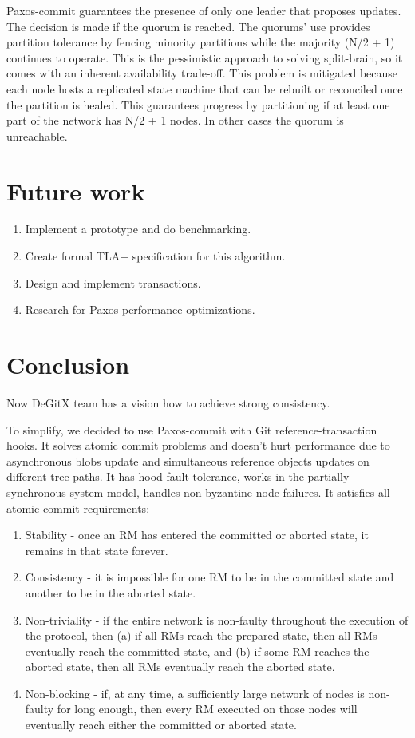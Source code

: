 \documentclass[sigplan, screen, nonacm, 11pt]{acmart}
\begin{document}
Paxos-commit guarantees the presence of only one leader that proposes updates.
The decision is made if the quorum is reached.
The quorums’ use provides partition tolerance by fencing minority partitions while the majority (N/2 + 1) continues to operate.
This is the pessimistic approach to solving split-brain,
so it comes with an inherent availability trade-off.
This problem is mitigated because each node hosts a replicated state machine that can be rebuilt or reconciled once the partition is healed.
This guarantees progress by partitioning if at least one part of the network has N/2 + 1 nodes.
In other cases the quorum is unreachable.

\section{Future work}

\begin{enumerate}
  \item Implement a prototype and do benchmarking.
  \item Create formal TLA+ specification for this algorithm.
  \item Design and implement transactions.
  \item Research for Paxos performance optimizations.
\end{enumerate}

\section{Conclusion}

Now DeGitX team has a vision how to achieve strong consistency.

To simplify, we decided to use Paxos-commit with Git reference-transaction hooks.
It solves atomic commit problems and doesn't hurt performance due to asynchronous blobs update
and simultaneous reference objects updates on different tree paths.
It has hood fault-tolerance, works in the partially synchronous system model,
handles non-byzantine node failures. It satisfies all atomic-commit requirements:

\begin{enumerate}
  \item Stability - once an RM has entered the committed or aborted state, it remains in that state forever.
  \item Consistency - it is impossible for one RM to be in the committed state and another to be in
  the aborted state.
  \item Non-triviality - if the entire network is non-faulty throughout the execution of the protocol,
  then (a) if all RMs reach the prepared state, then all RMs eventually reach the committed state,
  and (b) if some RM reaches the aborted state,  then all RMs eventually reach the aborted state.
  \item Non-blocking - if, at any time, a sufficiently large network of nodes is non-faulty for long enough,
  then every RM executed on those nodes will eventually reach either the committed or aborted state.
\end{enumerate}

\newpage



\end{document}
